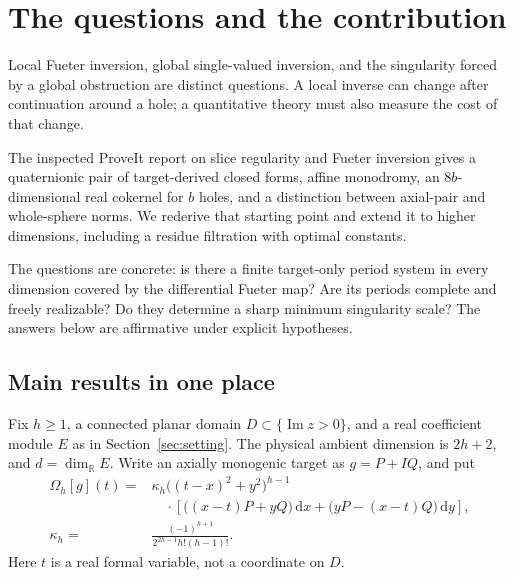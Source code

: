 \documentclass[11pt,a4paper]{article}
\numberwithin{equation}{section}
\theoremstyle{definition}
\theoremstyle{remark}
\newcommand{\R}{\mathbb R}
\newcommand{\Om}{\Omega_h}
\newcommand{\dd}{\,\mathrm d}
\begin{document}
\setcounter{tocdepth}{2}
\begingroup
\small
\setlength{\parskip}{0pt}
\tableofcontents
\endgroup
\clearpage
{}

\section{The questions and the contribution}
\label{sec:intro}

Local Fueter inversion, global single-valued inversion, and the singularity
forced by a global obstruction are distinct questions. A local inverse can
change after continuation around a hole; a quantitative theory must also
measure the cost of that change.

The inspected ProveIt report on slice regularity and Fueter inversion
\cite{repo} gives a quaternionic pair of target-derived closed forms, affine
monodromy, an $8b$-dimensional real cokernel for $b$ holes, and a distinction
between axial-pair and whole-sphere norms. We rederive that starting point and
extend it to higher dimensions, including a residue filtration with optimal
constants.

The questions are concrete: is there a finite target-only period system in
every dimension covered by the differential Fueter map? Are its periods
complete and freely realizable? Do they determine a sharp minimum singularity
scale? The answers below are affirmative under explicit hypotheses.

\subsection{Main results in one place}

Fix $h\ge1$, a connected planar domain $D\subset\{\operatorname{Im}z>0\}$,
and a real coefficient module $E$ as in Section~\ref{sec:setting}. The physical
ambient dimension is $2h+2$, and $d=\dim_{\R}E$. Write an axially monogenic target
as $g=P+IQ$, and put
\begin{equation}\label{eq:intro-current}
\begin{split}
\Om[g](t)={}&\kappa_h\bigl((t-x)^2+y^2\bigr)^{h-1}\\
&\quad\cdot\left[\bigl((x-t)P+yQ\bigr)\dd x
 +\bigl(yP-(x-t)Q\bigr)\dd y\right],\\
\kappa_h={}&\frac{(-1)^{h+1}}{2^{2h-1}h!(h-1)!}.
\end{split}
\end{equation}
Here $t$ is a real formal variable, not a coordinate on $D$.
\end{document}

